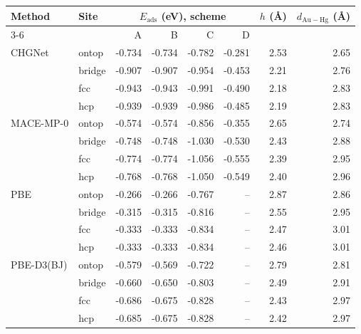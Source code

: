 \begin{tabular}{llrrrrrr}
\toprule
Method & Site & \multicolumn{4}{c}{$E_\mathrm{ads}$ (eV), scheme} & $h$ (\AA) & $d_\mathrm{Au-Hg}$ (\AA)\\
\cmidrule(lr){3-6}
 & & A & B & C & D & & \\
\midrule
CHGNet & ontop & -0.734 & -0.734 & -0.782 & -0.281 & 2.53 & 2.65\\
 & bridge & -0.907 & -0.907 & -0.954 & -0.453 & 2.21 & 2.76\\
 & fcc & -0.943 & -0.943 & -0.991 & -0.490 & 2.18 & 2.83\\
 & hcp & -0.939 & -0.939 & -0.986 & -0.485 & 2.19 & 2.83\\
\midrule
MACE-MP-0 & ontop & -0.574 & -0.574 & -0.856 & -0.355 & 2.65 & 2.74\\
 & bridge & -0.748 & -0.748 & -1.030 & -0.530 & 2.43 & 2.88\\
 & fcc & -0.774 & -0.774 & -1.056 & -0.555 & 2.39 & 2.95\\
 & hcp & -0.768 & -0.768 & -1.050 & -0.549 & 2.40 & 2.96\\
\midrule
PBE & ontop & -0.266 & -0.266 & -0.767 & -- & 2.87 & 2.86\\
 & bridge & -0.315 & -0.315 & -0.816 & -- & 2.55 & 2.95\\
 & fcc & -0.333 & -0.333 & -0.834 & -- & 2.47 & 3.01\\
 & hcp & -0.333 & -0.333 & -0.834 & -- & 2.46 & 3.01\\
\midrule
PBE-D3(BJ) & ontop & -0.579 & -0.569 & -0.722 & -- & 2.79 & 2.81\\
 & bridge & -0.660 & -0.650 & -0.803 & -- & 2.49 & 2.91\\
 & fcc & -0.686 & -0.675 & -0.828 & -- & 2.43 & 2.97\\
 & hcp & -0.685 & -0.675 & -0.828 & -- & 2.42 & 2.97\\
\bottomrule
\end{tabular}
